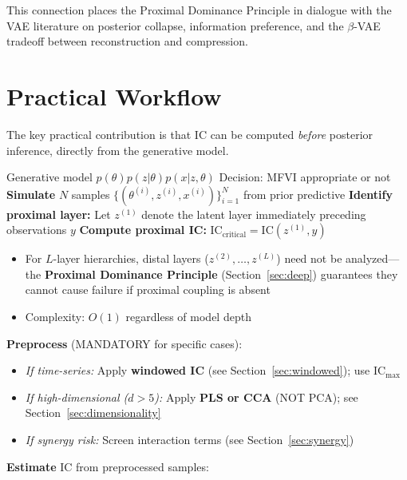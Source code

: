 \documentclass[10pt]{article} %
\theoremstyle{plain}
\theoremstyle{definition}
\newcommand{\IC}{\mathrm{IC}}  %
\begin{document}
This connection places the Proximal Dominance Principle in dialogue with the VAE literature on posterior collapse, information preference, and the $\beta$-VAE tradeoff between reconstruction and compression.

\section{Practical Workflow}
\label{sec:workflow}

The key practical contribution is that IC can be computed \emph{before} posterior inference, directly from the generative model.

\begin{algorithm}[!htbp]
\caption{Prior Predictive IC Diagnostic}
\label{alg:workflow}
\begin{algorithmic}[1]
\Require Generative model $p(\theta)p(z|\theta)p(x|z,\theta)$
\Ensure Decision: MFVI appropriate or not
\State \textbf{Simulate} $N$ samples $\{(\theta^{(i)}, z^{(i)}, x^{(i)})\}_{i=1}^N$ from prior predictive
\State \textbf{Identify proximal layer:} Let $z^{(1)}$ denote the latent layer immediately preceding observations $y$
\State \textbf{Compute proximal IC:} $\IC_{\text{critical}} = \IC(z^{(1)}, y)$
\begin{itemize}
    \item For $L$-layer hierarchies, distal layers ($z^{(2)}, \ldots, z^{(L)}$) need not be analyzed---the \textbf{Proximal Dominance Principle} (Section~\ref{sec:deep}) guarantees they cannot cause failure if proximal coupling is absent
    \item Complexity: $O(1)$ regardless of model depth
\end{itemize}
\State \textbf{Preprocess} (MANDATORY for specific cases):
\begin{itemize}
    \item \textit{If time-series:} Apply \textbf{windowed IC} (see Section~\ref{sec:windowed}); use $\IC_{\max}$
    \item \textit{If high-dimensional ($d > 5$):} Apply \textbf{PLS or CCA} (NOT PCA); see Section~\ref{sec:dimensionality}
    \item \textit{If synergy risk:} Screen interaction terms (see Section~\ref{sec:synergy})
\end{itemize}
\State \textbf{Estimate} $\IC$ from preprocessed samples:
\begin{itemize}

\end{itemize}
\end{algorithmic}
\end{algorithm}
\end{document}

